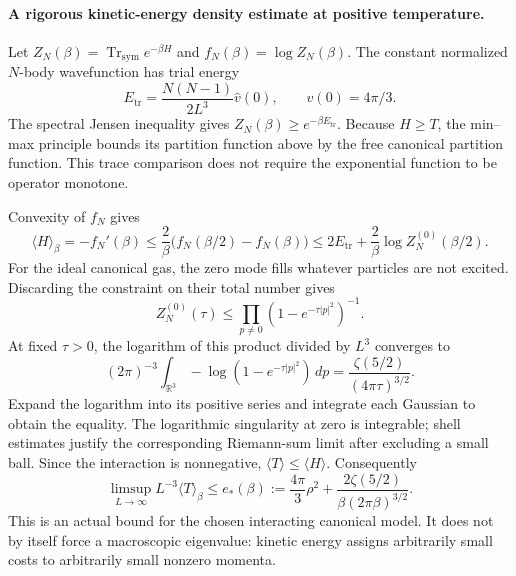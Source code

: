 \documentclass[11pt]{article}
\begin{document}
\paragraph{A rigorous kinetic-energy density estimate at positive temperature.}
Let $Z_N(\beta)=\operatorname{Tr}_{\mathrm{sym}}e^{-\beta H}$ and
$f_N(\beta)=\log Z_N(\beta)$. The constant normalized $N$-body
wavefunction has trial energy
\[
 E_{\mathrm{tr}}=\frac{N(N-1)}{2L^3}\widehat v(0),
 \qquad \widehat v(0)=4\pi/3.
\]
The spectral Jensen inequality gives
$Z_N(\beta)\ge e^{-\beta E_{\mathrm{tr}}}$.
Because $H\ge T$, the min--max principle bounds its partition function
above by the free canonical partition function. This trace comparison
does not require the exponential function to be operator monotone.

Convexity of $f_N$ gives
\[
 \langle H\rangle_\beta=-f_N'(\beta)
 \le\frac{2}{\beta}\bigl(f_N(\beta/2)-f_N(\beta)\bigr)
 \le 2E_{\mathrm{tr}}+\frac{2}{\beta}\log Z_N^{(0)}(\beta/2).
\]
For the ideal canonical gas, the zero mode fills whatever particles
are not excited. Discarding the constraint on their total number gives
\[
 Z_N^{(0)}(\tau)\le
        \prod_{p\ne0}(1-e^{-\tau|p|^2})^{-1}.
\]
At fixed $\tau>0$, the logarithm of this product divided by $L^3$
converges to
\[
 (2\pi)^{-3}\int_{\mathbb R^3}-\log(1-e^{-\tau|p|^2})\,dp
   =\frac{\zeta(5/2)}{(4\pi\tau)^{3/2}}.
\]
Expand the logarithm into its positive series and integrate each
Gaussian to obtain the equality. The logarithmic singularity at zero
is integrable; shell estimates justify the corresponding Riemann-sum
limit after excluding a small ball. Since the interaction is nonnegative,
$\langle T\rangle\le\langle H\rangle$. Consequently
\begin{equation}\label{bec:energy}
 \limsup_{L\to\infty}L^{-3}\langle T\rangle_\beta
 \le e_*(\beta):=\frac{4\pi}{3}\rho^2
       +\frac{2\zeta(5/2)}{\beta(2\pi\beta)^{3/2}}.
\end{equation}
This is an actual bound for the chosen interacting canonical model.
It does not by itself force a macroscopic eigenvalue: kinetic energy
assigns arbitrarily small costs to arbitrarily small nonzero momenta.
\end{document}
